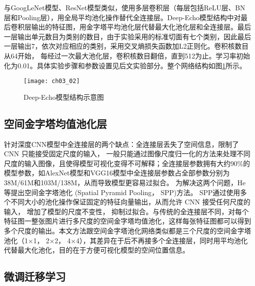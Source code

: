 与GoogLeNet模型\citep{Szegedy2015}、ResNet模型\citep{he15}类似，使用多层卷积层（每层包括ReLU层、BN层和Pooling层），用全局平均池化操作替代全连接层。Deep-Echo模型结构中对最后卷积层输出的特征图，用金字塔平均池化层\citep{he2015spp}代替最大化池化层和全连接层。最后一层输出单元数目为类别的数目，由于实验采用的标准切面有七个类别，因此最后一层输出7，依次对应相应的类别，采用交叉熵损失函数加L2正则化。卷积核数目从64开始， 每经过一次最大池化层，卷积核数目翻倍，直到512为止。学习率初始化为0.01。具体实验步骤和参数设置见后文实验部分。整个网络结构如图\ref{fig:ch03_02}所示。
 \begin{figure}[!htbp]
\centering
\texttt{[image: ch03\_02]}
\caption{Deep-Echo模型结构示意图}
\label{fig:ch03_02}
\end{figure}

\subsection{空间金字塔均值池化层}

针对深度CNN模型中全连接层的两个缺点：全连接层丢失了空间信息，限制了 CNN 只能接受固定尺度的输入， 一般只能通过图像尺度归一化的方法来处理不同尺度的输入图像，且使得模型可视化变得不可解释；全连接层参数拥有大约90\%的模型参数，如AlexNet模型\citep{Krizhevsky2012}和VGG16模型\citep{Chatfield2014}中全连接层参数占全部参数分别为38M/61M和103M/138M，从而导致模型更容易过拟合\citep{Szegedy2015}。
为解决这两个问题，He等提出空间金字塔池化 (Spatial Pyramid Pooling， SPP)方法\citep{he2015spp}。 SPP通过使用多个不同大小的池化操作保证固定的特征向量输出，从而允许 CNN 接受任何尺度的输入， 增加了模型的尺度不变性， 抑制过拟合。与传统的全连接层不同，对每个特征图一整张图片进行多尺度的空间金字塔均值池化，这样每张特征图都可以得到多个尺度的输出。本文方法跟空间金字塔池化网络类似都是三个尺度的空间金字塔池化（1×1， 2×2， 4×4），其差异在于后不再接多个全连接层，同时用平均池化代替最大化池化，目的在于方便可视化模型的空间位置信息。
\subsection{微调迁移学习}


